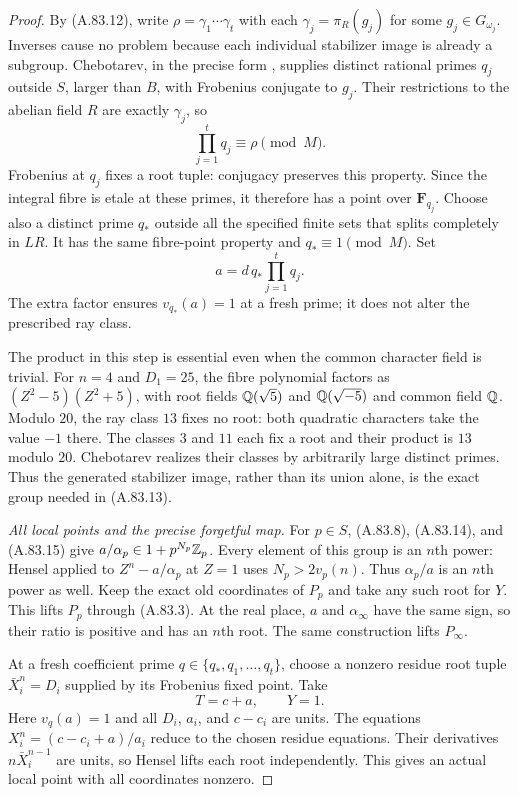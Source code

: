 \begin{proof}
By (A.83.12), write
$\rho=\gamma_1\cdots\gamma_t$ with each
$\gamma_j=\pi_R(g_j)$ for some $g_j\in G_{\omega_j}$.
Inverses cause no problem because each individual stabilizer
image is already a subgroup.  Chebotarev, in the precise form
\cite[Theorem 8.31]{AgentMilneANT}, supplies distinct rational
primes $q_j$ outside $S$, larger than $B$, with Frobenius
conjugate to $g_j$.  Their restrictions to the abelian field
$R$ are exactly $\gamma_j$, so
\[
                   \prod_{j=1}^t q_j\equiv\rho\pmod M.
 \tag{A.83.14}
\]
Frobenius at $q_j$ fixes a root tuple: conjugacy preserves this
property.  Since the integral fibre is etale at these primes,
it therefore has a point over $\mathbf F_{q_j}$.
Choose also a distinct prime $q_*$ outside all the specified
finite sets that splits completely in $LR$.
It has the same fibre-point property and $q_*\equiv1\pmod M$.
Set
\[
                         a=d\,q_*\prod_{j=1}^t q_j.
 \tag{A.83.15}
\]
The extra factor ensures $v_{q_*}(a)=1$ at a fresh prime;
it does not alter the prescribed ray class.

The product in this step is essential even when the common
character field is trivial.  For $n=4$ and $D_1=25$, the
fibre polynomial factors as
$(Z^2-5)(Z^2+5)$, with root fields
$\mathbb Q(\sqrt5)$ and $\mathbb Q(\sqrt{-5})$ and common field $\mathbb Q$.
Modulo $20$, the ray class $13$ fixes no root: both quadratic
characters take the value $-1$ there.  The classes $3$ and
$11$ each fix a root and their product is $13$ modulo $20$.
Chebotarev realizes their classes by arbitrarily large distinct
primes.  Thus the generated stabilizer image, rather than its
union alone, is the exact group needed in (A.83.13).

\emph{All local points and the precise forgetful map.}
For $p\in S$, (A.83.8), (A.83.14), and (A.83.15) give
$a/\alpha_p\in1+p^{N_p}\mathbb Z_p$.
Every element of this group is an $n$th power: Hensel applied
to $Z^n-a/\alpha_p$ at $Z=1$ uses
$N_p>2v_p(n)$.  Thus $\alpha_p/a$ is an $n$th power as well.
Keep the exact old coordinates of $P_p$ and take any such
root for $Y$.  This lifts $P_p$ through (A.83.3).
At the real place, $a$ and $\alpha_\infty$ have the same sign,
so their ratio is positive and has an $n$th root.  The same
construction lifts $P_\infty$.

At a fresh coefficient prime $q\in\{q_*,q_1,\ldots,q_t\}$,
choose a nonzero residue root tuple
$\bar X_i^n=D_i$ supplied by its Frobenius fixed point.
Take
\[
                              T=c+a,\qquad Y=1.
 \tag{A.83.16}
\]
Here $v_q(a)=1$ and all $D_i$, $a_i$, and $c-c_i$ are units.
The equations
$X_i^n=(c-c_i+a)/a_i$ reduce to the chosen residue equations.
Their derivatives $n\bar X_i^{n-1}$ are units, so Hensel lifts
each root independently.  This gives an actual local point
with all coordinates nonzero.


\end{proof}

